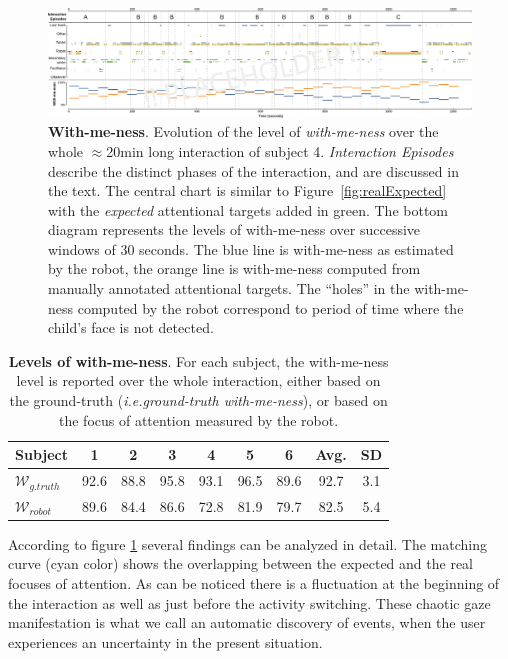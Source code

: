 \documentclass{sig-alternate}
\newcommand{\ie}{\textit{i.e.}\xspace}
\begin{document}
\begin{figure}
    \centering
    \includegraphics[width=\linewidth]{with-me-ness}
    \caption{\small \textbf{With-me-ness}. Evolution of the level of
        \emph{with-me-ness} over the whole $\approx$20min long interaction of
        subject 4. \emph{Interaction Episodes} describe the distinct phases of
        the interaction, and are discussed in the text. The central chart is
        similar to Figure~\ref{fig:realExpected} with the \emph{expected}
        attentional targets added in green. The bottom diagram represents the
        levels of with-me-ness over successive windows of 30 seconds. The blue
        line is with-me-ness as estimated by the robot, the orange line is
        with-me-ness computed from manually annotated attentional targets. The
        ``holes'' in the with-me-ness computed by the robot correspond to period of time
        where the child's face is not detected.}

    \label{fig:with-me-ness}
\end{figure}


\begin{table}[h!]
    \centering
    \caption{\textbf{Levels of with-me-ness}. For each subject, the with-me-ness
    level is reported over the whole interaction, either based on the
    ground-truth (\ie \emph{ground-truth with-me-ness}), or based on the focus of
    attention measured by the robot.}

    \begin{tabular}{p{1cm}cccccccc}
        \toprule
        Subject & 1 & 2 & 3 & 4 & 5 & 6 & Avg. & SD \\
        \midrule
        $\mathcal{W}_{g.truth}$ & 92.6 & 88.8  & 95.8 & 93.1 & 96.5 & 89.6 & 92.7 & 3.1 \\ 
        $\mathcal{W}_{robot}$ & 89.6 & 84.4 & 86.6 & 72.8 & 81.9 & 79.7 & 82.5 & 5.4 \\
        \bottomrule
    \end{tabular}
    \label{tab:results-with-me-ness}
\end{table}

According to figure \ref{fig:with-me-ness} several findings can be analyzed in
detail. The matching curve (cyan color) shows the overlapping between the
expected and the real focuses of attention. As can be noticed there is a
fluctuation at the beginning of the interaction as well as just before the
activity switching. These chaotic gaze manifestation is what we call an
automatic discovery of events, when the user experiences an uncertainty in the
present situation. 
\end{document}
